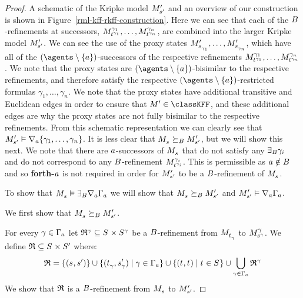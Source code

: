 \begin{proof}
A schematic of the Kripke model $\kPModelP{\kStateSP}$ and an overview of our construction is shown in Figure~\ref{rml-kff-rkff-construction}.
Here we can see that each of the $\agentsB$-refinements at successors, $\kPModel[\gamma_1]{\kStateT[\gamma_1]}, \dots, \kPModel[\gamma_n]{\kStateT[\gamma_n]}$, are combined into the larger Kripke model $\kPModelP{\kStateSP}$.
We can see the use of the proxy states $\kPModelP{\kStateS_{\gamma_1}}, \dots, \kPModelP{\kStateS_{\gamma_n}}$, which have all of the $(\agents \setminus \{\agentA\})$-successors of the respective refinements $\kPModel[\gamma_1]{\kStateT[\gamma_1]}, \dots, \kPModel[\gamma_n]{\kStateT[\gamma_n]}$.
We note that the proxy states are $(\agents \setminus \{\agentA\})$-bisimilar to the respective refinements, and therefore satisfy the respective $(\agents \setminus \{\agentA\})$-restricted formulas $\gamma_1, \dots, \gamma_n$.
We note that the proxy states have additional transitive and Euclidean edges in order to ensure that $\kModelP \in \classKFF$, and these additional edges are why the proxy states are not fully bisimilar to the respective refinements.
From this schematic representation we can clearly see that $\kPModelP{\kStateSP} \entails \coversA \{\gamma_1, \dots, \gamma_n\}$.
It is less clear that $\kPModel{\kStateS} \simulatesBs \kPModelP{\kStateSP}$, but we will show this next.
We note that there are $\agentA$-successors of $\kPModel{\kStateS}$ that do not satisfy any $\somerefsBs \gamma_i$ and do not correspond to any $\agentsB$-refinement $\kPModel[\gamma_i]{\kStateT[\gamma_i]}$.
This is permissible as $\agentA \notin \agentsB$ and so {\bf forth-$\agentA$} is not required in order for $\kPModelP{\kStateSP}$ to be a $\agentsB$-refinement of $\kPModel{\kStateS}$.

To show that $\kPModel{\kStateS} \entails \somerefsBs \coversA \Gamma_\agentA$ we will show that $\kPModel{\kStateS} \simulatesBs \kPModelP{\kStateSP}$ and $\kPModelP{\kStateSP} \entails \coversA \Gamma_\agentA$.

We first show that $\kPModel{\kStateS} \simulatesBs \kPModelP{\kStateSP}$.

For every $\gamma \in \Gamma_\agentA$ let $\refinement^\gamma \subseteq \kStates \times \kStates[\gamma]$ be a $\agentsB$-refinement from $\kPModel{\kStateT_\gamma}$ to $\kPModel[\gamma]{\kStateS[\gamma]}$.
We define $\refinement \subseteq \kStates \times \kStatesP$ where:
$$
\refinement = \{(\kStateS, \kStateSP)\} \cup \{(\kStateT_\gamma, \kStateSP_\gamma) \mid \gamma \in \Gamma_\agentA\} \cup \{(\kStateT, \kStateT) \mid \kStateT \in \kStates\} \cup \bigcup_{\gamma \in \Gamma_\agentA} \refinement^\gamma
$$
We show that $\refinement$ is a $\agentsB$-refinement from $\kPModel{\kStateS}$ to $\kPModelP{\kStateSP}$.


\end{proof}
